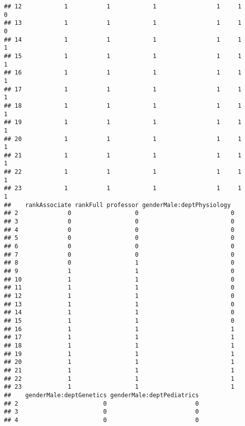 \documentclass[]{article}
\begin{document}
\begin{verbatim}
## 12            1           1            1                 1     1     0
## 13            1           1            1                 1     1     0
## 14            1           1            1                 1     1     1
## 15            1           1            1                 1     1     1
## 16            1           1            1                 1     1     1
## 17            1           1            1                 1     1     1
## 18            1           1            1                 1     1     1
## 19            1           1            1                 1     1     1
## 20            1           1            1                 1     1     1
## 21            1           1            1                 1     1     1
## 22            1           1            1                 1     1     1
## 23            1           1            1                 1     1     1
##    rankAssociate rankFull professor genderMale:deptPhysiology 
## 2              0                  0                          0
## 3              0                  0                          0
## 4              0                  0                          0
## 5              0                  0                          0
## 6              0                  0                          0
## 7              0                  0                          0
## 8              0                  1                          0
## 9              1                  1                          0
## 10             1                  1                          0
## 11             1                  1                          0
## 12             1                  1                          0
## 13             1                  1                          0
## 14             1                  1                          0
## 15             1                  1                          0
## 16             1                  1                          1
## 17             1                  1                          1
## 18             1                  1                          1
## 19             1                  1                          1
## 20             1                  1                          1
## 21             1                  1                          1
## 22             1                  1                          1
## 23             1                  1                          1
##    genderMale:deptGenetics genderMale:deptPediatrics
## 2                        0                         0
## 3                        0                         0
## 4                        0                         0

\end{verbatim}
\end{document}
